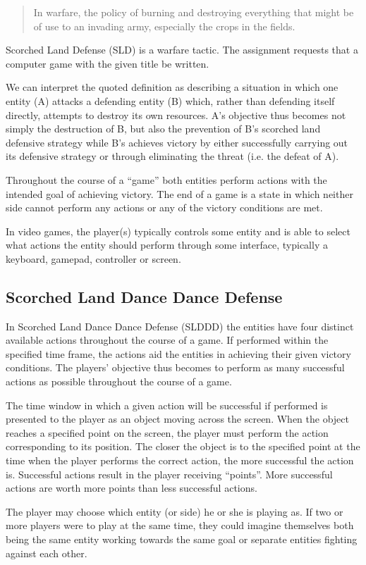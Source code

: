 \begin{quote}
	In warfare, the policy of burning and destroying everything that might be of use to an invading army, especially the crops in the fields.\cite{lab-compendium}
\end{quote}
Scorched Land Defense (SLD) is a warfare tactic. The assignment requests that a computer game with the given title be written.

We can interpret the quoted definition as describing a situation in which one entity (A) attacks a defending entity (B) which, rather than defending itself directly, attempts to destroy its own resources.
A's objective thus becomes not simply the destruction of B, but also the prevention of B's scorched land defensive strategy while B's achieves victory by either successfully carrying out its defensive strategy or through eliminating the threat (i.e. the defeat of A).

Throughout the course of a ``game'' both entities perform actions with the intended goal of achieving victory.
The end of a game is a state in which neither side cannot perform any actions or any of the victory conditions are met.

In video games, the player(s) typically controls some entity and is able to select what actions the entity should perform through some interface, typically a keyboard, gamepad, controller or screen.

\subsection{Scorched Land Dance Dance Defense}
In Scorched Land Dance Dance Defense (SLDDD) the entities have four distinct available actions throughout the course of a game.
If performed within the specified time frame, the actions aid the entities in achieving their given victory conditions.
The players' objective thus becomes to perform as many successful actions as possible throughout the course of a game.

The time window in which a given action will be successful if performed is presented to the player as an object moving across the screen.
When the object reaches a specified point on the screen, the player must perform the action corresponding to its position.
The closer the object is to the specified point at the time when the player performs the correct action, the more successful the action is.
Successful actions result in the player receiving ``points''.
More successful actions are worth more points than less successful actions.

The player may choose which entity (or side) he or she is playing as.
If two or more players were to play at the same time, they could imagine themselves both being the same entity working towards the same goal or separate entities fighting against each other.

